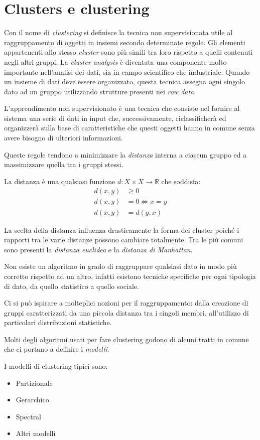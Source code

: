 \chapter{Clusters e clustering}
	Con il nome di \emph{clustering} si definisce la tecnica non supervisionata utile al raggruppamento di oggetti in insiemi secondo determinate regole. Gli elementi appartenenti allo stesso \emph{cluster} sono più simili tra loro rispetto a quelli contenuti negli altri gruppi. La \emph{cluster analysis} è diventata una componente molto importante nell'analisi dei dati, sia in campo scientifico che industriale. Quando un insieme di dati deve essere organizzato, questa tecnica assegna ogni singolo dato ad un gruppo utilizzando strutture presenti nei \emph{row data}.

	L'apprendimento non supervisionato è una tecnica che consiste nel fornire al sistema una serie di dati in input che, successivamente, riclassificherà ed organizzerà sulla base di caratteristiche che questi oggetti hanno in comune senza avere bisogno di ulteriori informazioni.

	Queste regole tendono a minimizzare la \emph{distanza} interna a ciascun gruppo ed a massimizzare quella tra i gruppi stessi.

	La distanza è una qualsiasi funzione $d:X \times X \to \mathbb{R}$ che soddisfa:
	\begin{align*}
		d(x,y) &\geq 0 \\
		d(x,y) &= 0 \iff x=y \\
		d(x,y) &= d(y,x)
	\end{align*}

	La scelta della distanza influenza drasticamente la forma dei cluster poiché i rapporti tra le varie distanze possono cambiare totalmente. Tra le più comuni sono presenti la \emph{distanza euclidea} e la \emph{distanza di Manhattan}.

	Non esiste un algoritmo in grado di raggruppare qualsiasi dato in modo più corretto rispetto ad un altro, infatti esistono tecniche specifiche per ogni tipologia di dato, da quello statistico a quello sociale.

	Ci si può ispirare a molteplici nozioni per il raggruppamento: dalla creazione di gruppi caratterizzati da una piccola distanza tra i singoli membri, all’utilizzo di particolari distribuzioni statistiche.

	Molti degli algoritmi usati per fare clustering godono di alcuni tratti in comune che ci portano a definire i \emph{modelli}.

	I modelli di clustering tipici sono:
	\begin{itemize}
		\item Partizionale
		\item Gerarchico
		\item Spectral
		\item Altri modelli
	\end{itemize}

	
	
	
	
%	
%	
